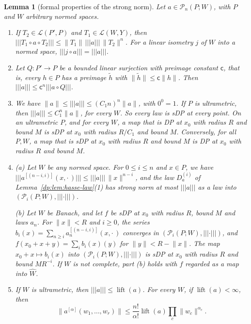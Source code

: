 \documentclass[11pt]{amsart}
\newtheorem{lemma}[theorem]{Lemma}
\theoremstyle{definition}
\theoremstyle{remark}
\numberwithin{equation}{section}
\newcommand{\cL}{\mathcal L}
\newcommand{\norm}[1]{\lVert #1\rVert}
\theoremstyle{plain}
\theoremstyle{definition}
\theoremstyle{plain}
\newcommand{\cP}{\mathcal P}
\begin{document}
\begin{lemma}[formal properties of the strong norm]\label{dp:lem:strong-formal}
Let $a\in\cP_n(P;W)$, with $P$ and $W$ arbitrary normed spaces.
\begin{enumerate}
\item If $T_2\in\cL(P',P)$ and $T_1\in\cL(W,Y)$, then $\lvert\!\lvert\!\lvert T_1\circ a\circ T_2\rvert\!\rvert\!\rvert\le\norm{T_1}\,\lvert\!\lvert\!\lvert a\rvert\!\rvert\!\rvert\,\norm{T_2}^n$. For a linear isometry $j$ of $W$ into a normed space, $\lvert\!\lvert\!\lvert j\circ a\rvert\!\rvert\!\rvert=\lvert\!\lvert\!\lvert a\rvert\!\rvert\!\rvert$.
\item Let $Q\colon P'\to P$ be a bounded linear surjection with preimage constant $\mathsf c$, that is, every $h\in P$ has a preimage $\tilde h$ with $\norm{\tilde h}\le\mathsf c\norm h$. Then $\lvert\!\lvert\!\lvert a\rvert\!\rvert\!\rvert\le\mathsf c^n\lvert\!\lvert\!\lvert a\circ Q\rvert\!\rvert\!\rvert$.
\item We have $\norm a\le\lvert\!\lvert\!\lvert a\rvert\!\rvert\!\rvert\le(C_1n)^n\norm a$, with $0^0=1$. If $P$ is ultrametric, then $\lvert\!\lvert\!\lvert a\rvert\!\rvert\!\rvert\le C_1^n\norm a$, for every $W$. So every law is sDP at every point. On an ultrametric $P$, and for every $W$, a map that is DP at $x_0$ with radius $R$ and bound $M$ is sDP at $x_0$ with radius $R/C_1$ and bound $M$. Conversely, for all $P,W$, a map that is sDP at $x_0$ with radius $R$ and bound $M$ is DP at $x_0$ with radius $R$ and bound $M$.
\item (a) Let $W$ be any normed space. For $0\le i\le n$ and $x\in P$, we have $\lvert\!\lvert\!\lvert a^{[(n-i,i)]}(x,\cdot\,)\rvert\!\rvert\!\rvert\le\lvert\!\lvert\!\lvert a\rvert\!\rvert\!\rvert\,\norm x^{n-i}$, and the law $D^{(i)}_a$ of Lemma~\ref{dp:lem:hasse-law}(1) has strong norm at most $\lvert\!\lvert\!\lvert a\rvert\!\rvert\!\rvert$ as a law into $(\cP_i(P;W),\lvert\!\lvert\!\lvert\cdot\rvert\!\rvert\!\rvert)$.

(b) Let $W$ be Banach, and let $f$ be sDP at $x_0$ with radius $R$, bound $M$ and laws $a_n$. For $\norm x<R$ and $i\ge0$, the series $b_i(x)=\sum_{n\ge i}a_n^{[(n-i,i)]}(x,\cdot\,)$ converges in $(\cP_i(P;W),\lvert\!\lvert\!\lvert\cdot\rvert\!\rvert\!\rvert)$, and $f(x_0+x+y)=\sum_ib_i(x)(y)$ for $\norm y<R-\norm x$. The map $x_0+x\mapsto b_i(x)$ into $(\cP_i(P;W),\lvert\!\lvert\!\lvert\cdot\rvert\!\rvert\!\rvert)$ is sDP at $x_0$ with radius $R$ and bound $MR^{-i}$. If $W$ is not complete, part (b) holds with $f$ regarded as a map into $\widehat W$.
\item If $W$ is ultrametric, then $\lvert\!\lvert\!\lvert a\rvert\!\rvert\!\rvert\le\operatorname{lift}(a)$. For every $W$, if $\operatorname{lift}(a)<\infty$, then
\[
 \norm{a^{[\alpha]}(w_1,\dots,w_r)}\le\frac{n!}{\alpha!}\operatorname{lift}(a)\prod_c\norm{w_c}^{\alpha_c}.
\]
\end{enumerate}
\end{lemma}
\end{document}
